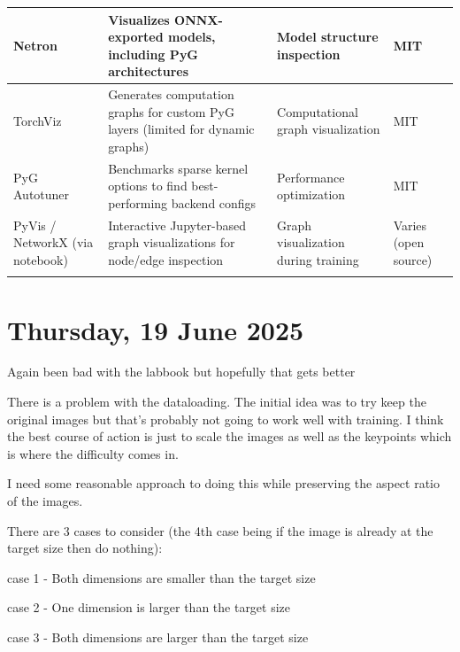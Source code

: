 \begin{table}[H]
\begin{tabular}{ !{\vrule width 1.1pt}
		p{3cm}!{\vrule width 1pt}
		p{5cm}!{\vrule width 1pt}
		p{3.5cm}!{\vrule width 1pt}
		p{2.5cm}!{\vrule width 1.1pt}}
		Netron                                       & Visualizes ONNX-exported models, including PyG architectures                                       & Model structure inspection                & MIT
		\\ \hline

		TorchViz                                     & Generates computation graphs for custom PyG layers (limited for dynamic graphs)                    & Computational graph visualization         & MIT
		\\ \hline

		PyG Autotuner                                & Benchmarks sparse kernel options to find best-performing backend configs                           & Performance optimization                  & MIT
		\\ \hline

		PyVis / NetworkX (via notebook)              & Interactive Jupyter-based graph visualizations for node/edge inspection                            & Graph visualization during training       & Varies (open source)
		\\ 
	\end{tabular}
\end{table}

\section[2025/06/19]{Thursday, 19 June 2025}
\label{sec:20250619}

Again been bad with the labbook but hopefully that gets better

There is a problem with the dataloading. The initial idea was to try keep the
original images but that's probably not going to work well with training. I think the best
course of action is just to scale the images as well as the keypoints which is where the difficulty
comes in.

I need some reasonable approach to doing this while preserving the aspect ratio of the images.

There are 3 cases to consider (the 4th case being if the image is already at the target size then do nothing):

\begin{compactitem}
	\item case 1 - Both dimensions are smaller than the target size
	\item case 2 - One dimension is larger than the target size
	\item case 3 - Both dimensions are larger than the target size
\end{compactitem}

